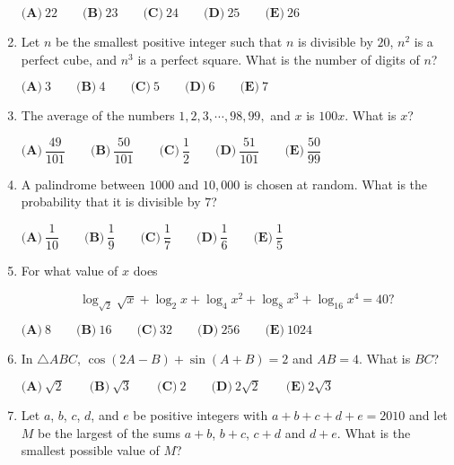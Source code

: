 \documentclass{article}
\begin{document}
\begin{enumerate}[label=\arabic*., itemsep=0.5em]
$\textbf{(A)}\ 22 \qquad \textbf{(B)}\ 23 \qquad \textbf{(C)}\ 24 \qquad \textbf{(D)}\ 25 \qquad \textbf{(E)}\ 26$\par \vspace{0.5em}\item Let $n$ be the smallest positive integer such that $n$ is divisible by $20$, $n^2$ is a perfect cube, and $n^3$ is a perfect square. What is the number of digits of $n$?

$\textbf{(A)}\ 3 \qquad \textbf{(B)}\ 4 \qquad \textbf{(C)}\ 5 \qquad \textbf{(D)}\ 6 \qquad \textbf{(E)}\ 7$\par \vspace{0.5em}\item The average of the numbers $1, 2, 3,\cdots, 98, 99,$ and $x$ is $100x$. What is $x$?

$\textbf{(A)}\ \dfrac{49}{101} \qquad \textbf{(B)}\ \dfrac{50}{101} \qquad \textbf{(C)}\ \dfrac{1}{2} \qquad \textbf{(D)}\ \dfrac{51}{101} \qquad \textbf{(E)}\ \dfrac{50}{99}$\par \vspace{0.5em}\item A palindrome between $1000$ and $10,000$ is chosen at random. What is the probability that it is divisible by $7$?

$\textbf{(A)}\ \dfrac{1}{10} \qquad \textbf{(B)}\ \dfrac{1}{9} \qquad \textbf{(C)}\ \dfrac{1}{7} \qquad \textbf{(D)}\ \dfrac{1}{6} \qquad \textbf{(E)}\ \dfrac{1}{5}$\par \vspace{0.5em}\item For what value of $x$ does


\begin{equation*}
\log_{\sqrt{2}}\sqrt{x}+\log_{2}{x}+\log_{4}{x^2}+\log_{8}{x^3}+\log_{16}{x^4}=40?
\end{equation*}


$\textbf{(A)}\ 8 \qquad \textbf{(B)}\ 16 \qquad \textbf{(C)}\ 32 \qquad \textbf{(D)}\ 256 \qquad \textbf{(E)}\ 1024$\par \vspace{0.5em}\item In $\triangle ABC$, $\cos(2A-B)+\sin(A+B)=2$ and $AB=4$. What is $BC$?

$\textbf{(A)}\ \sqrt{2} \qquad \textbf{(B)}\ \sqrt{3} \qquad \textbf{(C)}\ 2 \qquad \textbf{(D)}\ 2\sqrt{2} \qquad \textbf{(E)}\ 2\sqrt{3}$\par \vspace{0.5em}\item Let $a$, $b$, $c$, $d$, and $e$ be positive integers with $a+b+c+d+e=2010$ and let $M$ be the largest of the sums $a+b$, $b+c$, $c+d$ and $d+e$. What is the smallest possible value of $M$?


\end{enumerate}
\end{document}

